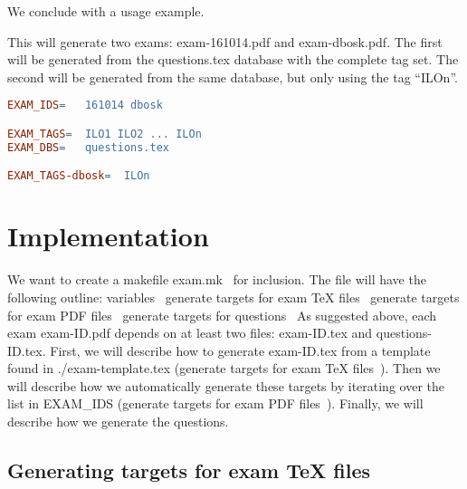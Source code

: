 We conclude with a usage example.
\begin{example}
  This will generate two exams: {\Tt{}exam-161014.pdf\nwendquote} and {\Tt{}exam-dbosk.pdf\nwendquote}.
  The first will be generated from the {\Tt{}questions.tex\nwendquote} database with the 
  complete tag set.
  The second will be generated from the same database, but only using the tag 
  \enquote{ILOn}.
  \begin{lstlisting}[language=make]
EXAM_IDS=   161014 dbosk

EXAM_TAGS=  ILO1 ILO2 ... ILOn
EXAM_DBS=   questions.tex

EXAM_TAGS-dbosk=  ILOn
  \end{lstlisting}
\end{example}


\section{Implementation}

We want to create a makefile {\Tt{}\LA{}exam.mk~{\nwtagstyle{}}\RA{}\nwendquote} for inclusion.
The file will have the following outline:
\nwenddocs{}\endmoddef\nwstartdeflinemarkup\nwenddeflinemarkup
\LA{}variables~{\nwtagstyle{}}\RA{}
\LA{}generate targets for exam TeX files~{\nwtagstyle{}}\RA{}
\LA{}generate targets for exam PDF files~{\nwtagstyle{}}\RA{}
\LA{}generate targets for questions~{\nwtagstyle{}}\RA{}
\nwendcode{}As suggested above, each exam {\Tt{}exam-ID.pdf\nwendquote} depends on at least two files: 
{\Tt{}exam-ID.tex\nwendquote} and {\Tt{}questions-ID.tex\nwendquote}.
First, we will describe how to generate {\Tt{}exam-ID.tex\nwendquote} from a template found in 
{\Tt{}./exam-template.tex\nwendquote} ({\Tt{}\LA{}generate targets for exam TeX files~{\nwtagstyle{}}\RA{}\nwendquote}).
Then we will describe how we automatically generate these targets by iterating 
over the list in {\Tt{}EXAM{\_}IDS\nwendquote} ({\Tt{}\LA{}generate targets for exam PDF files~{\nwtagstyle{}}\RA{}\nwendquote}).
Finally, we will describe how we generate the questions.

\subsection{Generating targets for exam TeX files}

